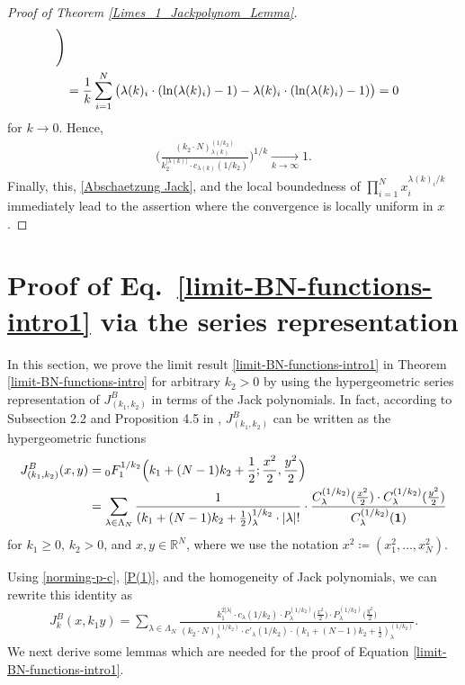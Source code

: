\documentclass[reqno]{amsart}
\theoremstyle{plain}
\theoremstyle{definition}
\numberwithin{equation}{section}
\newcommand{\R}{\mathbb{R}}
\newcommand{\xra}{\xrightarrow}
\begin{document}
\begin{proof}[Proof of Theorem \ref{Limes_1_Jackpolynom_Lemma}]
\begin{align}
\Bigg) \notag\\
&= \frac{1}{k}\sum\limits_{i=1}^N \big(\lambda(k)_i \cdot (\ln(\lambda(k)_i)-1) - \lambda(k)_i \cdot (\ln(\lambda(k)_i)-1)\big)
= 0
\end{align}
for $k\to0$. Hence,
\begin{align}\label{Limes P(1)}
\Bigg( \frac{(k_2 \cdot N)_{\lambda(k)}^{(1/k_2)}}{k_2^{|\lambda(k)|} \cdot c_{\lambda(k)}(1/k_2)} \Bigg)^{1/k} \xra[k \to \infty]{} 1.
\end{align}
Finally, this, \eqref{Abschaetzung Jack},  and the local boundedness of $\prod_{i=1}^{N} x_i^{\lambda(k)_i/k}$
immediately lead to the assertion where  the convergence is locally uniform in $x$.
\end{proof}



\section{Proof of Eq.~\eqref{limit-BN-functions-intro1}  via the series representation}


In this section, we prove the limit result \eqref{limit-BN-functions-intro1} in Theorem \ref{limit-BN-functions-intro} for arbitrary
$k_2>0$ by using the hypergeometric series representation 
of $J^B_{(k_1,k_2)}$ in terms of the Jack polynomials.
In fact, according to Subsection 2.2 and Proposition 4.5 in \cite{R4},  $J^{B}_{(k_1,k_2)}$
can be written as the hypergeometric functions
\begin{align}\label{series-rep-bessel}
J^{B}_{(k_1,k_2)}(x,y) 
&= {}_0F_1^{1/k_2}\Big(k_1+(N-1)k_2+\frac{1}{2};\frac{x^2}{2},\frac{y^2}{2}\Big) \\
&= \sum\limits_{\lambda \in \Lambda_N}
\frac
{1}{(k_1+(N-1)k_2+\frac{1}{2})_{\lambda}^{1/k_2} \cdot |\lambda|!} 
\cdot 
\frac{C_{\lambda}^{(1/k_2)}(\frac{x^2}{2}) \cdot C_{\lambda}^{(1/k_2)}(\frac{y^2}{2})}
{C_{\lambda}^{(1/k_2)}({\bf 1})}
\notag\end{align}
for $k_1 \geq 0$, $k_2>0$, and $x,y\in\R^N$, where we use the notation $x^2 \coloneqq (x_1^2,\ldots,x_N^2)$.

Using \eqref{norming-p-c}, \eqref{P(1)}, and the homogeneity of Jack polynomials, we can rewrite this identity as
\begin{align}\label{P-Darstellung Besselfunktion}
J_k^{B}(x,k_1y)
=
\sum\limits_{\lambda \in \Lambda_N}
\frac
{k_1^{2|\lambda|} \cdot c_{\lambda}(1/k_2) \cdot P_{\lambda}^{(1/k_2)}\big(\frac{x^2}{2}\big) \cdot P_{\lambda}^{(1/k_2)}\big(\frac{y^2}{2}\big)}
{(k_2 \cdot N)_{\lambda}^{(1/k_2)} \cdot c'_{\lambda}(1/k_2) \cdot (k_1 + (N-1)k_2 + \frac{1}{2})_{\lambda}^{(1/k_2)}}.
\end{align}
We next derive some lemmas which are needed for the proof of Equation \eqref{limit-BN-functions-intro1}.
\end{document}
